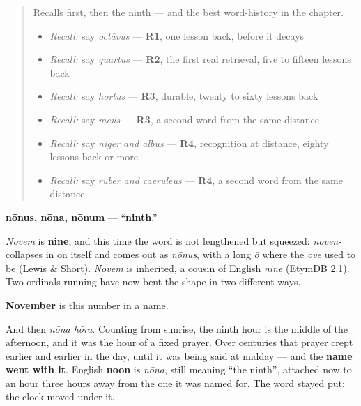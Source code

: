 \label{lesson:LA-C56-nonus}



\begin{quote}
Recalls first, then the ninth — and the best word-history in the chapter.

\begin{itemize}
\raggedright
  \item \emph{Recall:} say \emph{octāvus} — \textbf{R1}, one lesson back, before it decays
  \item \emph{Recall:} say \emph{quārtus} — \textbf{R2}, the first real retrieval, five to fifteen lessons back
  \item \emph{Recall:} say \emph{hortus} — \textbf{R3}, durable, twenty to sixty lessons back
  \item \emph{Recall:} say \emph{meus} — \textbf{R3}, a second word from the same distance
  \item \emph{Recall:} say \emph{niger and albus} — \textbf{R4}, recognition at distance, eighty lessons back or more
  \item \emph{Recall:} say \emph{ruber and caeruleus} — \textbf{R4}, a second word from the same distance
\end{itemize}
\end{quote}

\begin{cousinweb}
\textbf{nōnus, nōna, nōnum} — \textquotedblleft{}\textbf{ninth}.\textquotedblright{}

\emph{Novem} is \textbf{nine}, and this time the word is not lengthened but squeezed: \emph{noven-} collapses in on itself and comes out as \emph{nōnus}, with a long \emph{ō} where the \emph{ove} used to be (Lewis \& Short). \emph{Novem} is inherited, a cousin of English \emph{nine} (EtymDB 2.1). Two ordinals running have now bent the shape in two different ways.

\textbf{November} is this number in a name.

And then \emph{nōna hōra}. Counting from sunrise, the ninth hour is the middle of the afternoon, and it was the hour of a fixed prayer. Over centuries that prayer crept earlier and earlier in the day, until it was being said at midday — and the \textbf{name went with it}. English \textbf{noon} is \emph{nōna}, still meaning \textquotedblleft{}the ninth\textquotedblright{}, attached now to an hour three hours away from the one it was named for. The word stayed put; the clock moved under it.
\end{cousinweb}

